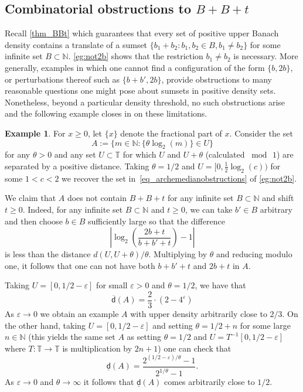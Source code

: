 \documentclass[10pt,dvipsnames]{article}
\theoremstyle{definition}
\newtheorem{example}[theorem]{Example}
\theoremstyle{plain}
\newcommand{\N}{\mathbb{N}}
\newcommand{\T}{\mathbb{T}}
\newcommand{\udens}{\overline{\mathsf{d}}}
\newcommand{\ldens}{\underline{\mathsf{d}}}
\begin{document}
\subsection{Combinatorial obstructions to $B+B+t$}
Recall \cref{thm_BBt} which guarantees that every set of positive upper Banach density contains a translate of a 
sumset $\{b_1+b_2:b_1,b_2\in B,b_1\neq b_2\}$ for some infinite set $B\subset\N$.
\cref{eg:not2b} shows that the restriction $b_1 \ne b_2$ is necessary.
More generally, examples in which one cannot find a configuration of the form $\{b ,2b\}$, or perturbations thereof such as  $\{b + b', 2b \}$, provide obstructions to many reasonable questions one might pose about sumsets in positive density sets. 
Nonetheless, beyond a particular density threshold, no such obstructions arise and the following example closes in on these limitations.

\begin{example}
\label{example_nextexamplebutnowitsgone}
For $x\geq 0$, let $\{x\}$ denote the fractional part of $x$.  
Consider the set 
\[
A:=\Big\{m\in\N:\big\{\theta\log_2(m)\big\}\in U\Big\}
\]
for any $\theta>0$ and any set $U\subset\T$ for which $U$ and $U+\theta$ (calculated $\bmod\,1$) are separated by a positive distance.
Taking $\theta=1/2$ and $U=\big[0,\tfrac12\log_2(c)\big)$ for some $1 < c< 2$ we recover the set in~\eqref{eq_archemedianobstructions} of \cref{eg:not2b}.

We claim that $A$ does not contain $B+B+t$ for any infinite set $B\subset\N$ and shift $t\geq 0$.
Indeed, for any infinite set $B\subset\N$ and $t\geq 0$, we can take $b'\in B$ arbitrary and then choose $b\in B$ sufficiently large so that the difference
\[
\left|\log_2\left(\frac{2b+t}{b+b'+t}\right)-1\right|
\]
is less than the distance $d(U,U+\theta)/\theta$.
Multiplying by $\theta$ and reducing modulo one, it follows that one can not have both $b+b'+t$ and $2b+t$ in $A$.

Taking $U=[0,1/2-\varepsilon]$ for small $\varepsilon>0$ and $\theta=1/2$, we have that 
\[
\udens(A)=\frac23\cdot(2-4^\varepsilon)
\]
As $\varepsilon\to0$ we obtain an example $A$ with upper density arbitrarily close to $2/3$.
On the other hand, taking  $U=[0,1/2-\varepsilon]$ and setting $\theta=1/2+n$ for some large $n\in\N$ (this yields the same set $A$ as setting $\theta=1/2$ and $U=T^{-1}[0,1/2-\varepsilon]$ where $T\colon\T\to\T$ is multiplication by $2n+1$) one can check that 
\[
\ldens(A)=\frac{2^{(1/2-\varepsilon)/\theta}-1}{2^{1/\theta}-1}.
\]
As $\varepsilon\to0$ and $\theta\to\infty$ it follows that $\ldens(A)$ comes  arbitrarily close to $1/2$.
\end{example}
\end{document}
